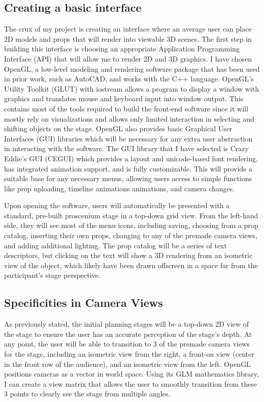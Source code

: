 \documentclass[10pt,twocolumn]{article}
\begin{document}
\subsection{Creating a basic interface}
The crux of my project is creating an interface where an average user can place 2D models and props that will render into viewable 3D scenes. The first step in building this interface is choosing an appropriate Application Programming Interface (API) that will allow me to render 2D and 3D graphics. I have chosen OpenGL, a low-level modeling and rendering software package that has been used in prior work, such as AutoCAD, and works with the C++ language. OpenGL's Utility Toolkit (GLUT) with iostream allows a program to display a window with graphics and translates mouse and keyboard input into window output. This contains most of the tools required to build the front-end software since it will mostly rely on visualizations and allows only limited interaction in selecting and shifting objects on the stage. OpenGL also provides basic Graphical User Interfaces (GUI) libraries which will be necessary for any extra user abstraction in interacting with the software. The GUI library that I have selected is Crazy Eddie's GUI (CEGUI) which provides a layout and unicode-based font rendering, has integrated animation support, and is fully customizable. This will provide a suitable base for any necessary menus, allowing users access to simple functions like prop uploading, timeline animations animations, and camera changes.

Upon opening the software, users will automatically be presented with a standard, pre-built proscenium stage in a top-down grid view. From the left-hand side, they will see most of the menu icons, including saving, choosing from a prop catalog, inserting their own props, changing to any of the premade camera views, and adding additional lighting. The prop catalog will be a series of text descriptors, but clicking on the text will show a 3D rendering from an isometric view of the object, which likely have been drawn offscreen in a space far from the participant's stage perspective. 

\subsection{Specificities in Camera Views}
As previously stated, the initial planning stages will be a top-down 2D view of the stage to ensure the user has an accurate perception of the stage's depth. At any point, the user will be able to transition to 3 of the premade camera views for the stage, including an isometric view from the right, a front-on view (center in the front row of the audience), and an isometric view from the left. OpenGL positions cameras as a vector in world space. Using its GLM mathematics library, I can create a view matrix that allows the user to smoothly transition from these 3 points to clearly see the stage from multiple angles.  
\end{document}
